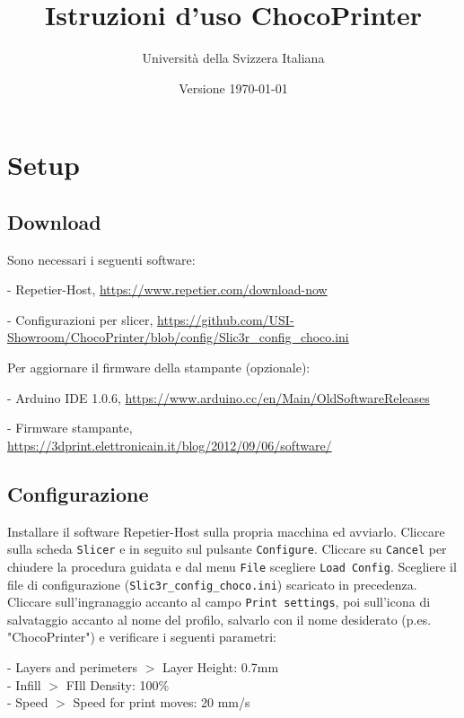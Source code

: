 \documentclass[12pt]{article}
\title{Istruzioni d'uso ChocoPrinter}
\author{Università della Svizzera Italiana}
\date{Versione \today}
\begin{document}
\maketitle
\tableofcontents
\newpage

\section{Setup}

	\subsection{Download}\label{sec:download}

		Sono necessari i seguenti software:

		- Repetier-Host, \url{https://www.repetier.com/download-now}

		- Configurazioni per slicer, \url{https://github.com/USI-Showroom/ChocoPrinter/blob/config/Slic3r_config_choco.ini}

		Per aggiornare il firmware della stampante (opzionale):

		- Arduino IDE 1.0.6, \url{https://www.arduino.cc/en/Main/OldSoftwareReleases}

		- Firmware stampante, \url{https://3dprint.elettronicain.it/blog/2012/09/06/software/}
		
		
	\subsection{Configurazione}
	
		Installare il software Repetier-Host sulla propria macchina ed avviarlo. Cliccare sulla scheda \texttt{Slicer} e in seguito sul pulsante \texttt{Configure}. Cliccare su \texttt{Cancel} per chiudere la procedura guidata e dal menu \texttt{File} scegliere \texttt{Load Config}. Scegliere il file di configurazione (\texttt{Slic3r\_config\_choco.ini}) scaricato in precedenza.\\
		Cliccare sull'ingranaggio accanto al campo \texttt{Print settings}, poi sull'icona di salvataggio accanto al nome del profilo, salvarlo con il nome desiderato (p.es. "ChocoPrinter") e verificare i seguenti parametri:
		
		- Layers and perimeters $>$ Layer Height: 0.7mm\\
		- Infill $>$ FIll Density: 100\%\\
		- Speed $>$ Speed for print moves: 20 mm/s\\
		
\end{document}
